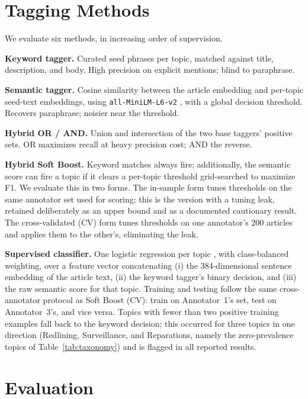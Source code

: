\documentclass[letterpaper]{article}
\begin{document}
\section{Tagging Methods}
\label{sec:methods}

We evaluate six methods, in increasing order of supervision.

\textbf{Keyword tagger.} Curated seed phrases per topic, matched
against title, description, and body. High precision on explicit
mentions; blind to paraphrase.

\textbf{Semantic tagger.} Cosine similarity between the article
embedding and per-topic seed-text embeddings, using
\texttt{all-MiniLM-L6-v2} \citep{reimers2019}, with a global decision
threshold. Recovers paraphrase; noisier near the threshold.

\textbf{Hybrid OR / AND.} Union and intersection of the two base
taggers' positive sets. OR maximizes recall at heavy precision cost;
AND the reverse.

\textbf{Hybrid Soft Boost.} Keyword matches always fire; additionally,
the semantic score can fire a topic if it clears a per-topic threshold
grid-searched to maximize F1. We evaluate this in two forms. The
in-sample form tunes thresholds on the same annotator set used for
scoring; this is the version with a tuning leak, retained deliberately
as an upper bound and as a documented cautionary result. The
cross-validated (CV) form tunes thresholds on one annotator's 200
articles and applies them to the other's, eliminating the leak.

\textbf{Supervised classifier.} One logistic regression per topic
\citep{pedregosa2011}, with class-balanced weighting, over a feature
vector concatenating (i) the 384-dimensional sentence embedding of the
article text, (ii) the keyword tagger's binary decision, and (iii) the
raw semantic score for that topic. Training and testing follow the same
cross-annotator protocol as Soft Boost (CV): train on Annotator~1's
set, test on Annotator~3's, and vice versa. Topics with fewer than two
positive training examples fall back to the keyword decision; this
occurred for three topics in one direction (Redlining, Surveillance,
and Reparations, namely the zero-prevalence topics of
Table~\ref{tab:taxonomy}) and is flagged in all reported results.

\section{Evaluation}
\label{sec:eval}
\end{document}

